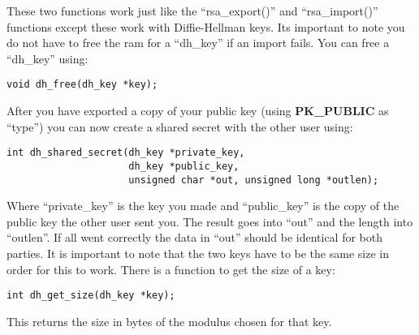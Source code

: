 \documentclass[synpaper]{book}
\begin{document}
These two functions work just like the ``rsa\_export()'' and ``rsa\_import()'' functions except these work with 
Diffie-Hellman keys. Its important to note you do not have to free the ram for a ``dh\_key'' if an import fails.  You can free a 
``dh\_key'' using:
\begin{verbatim}
void dh_free(dh_key *key);
\end{verbatim}
After you have exported a copy of your public key (using {\bf PK\_PUBLIC} as ``type'') you can now create a shared secret 
with the other user using:
\begin{verbatim}
int dh_shared_secret(dh_key *private_key, 
                     dh_key *public_key, 
                     unsigned char *out, unsigned long *outlen);
\end{verbatim}

Where ``private\_key'' is the key you made and ``public\_key'' is the copy of the public key the other user sent you.  The result goes
into ``out'' and the length into ``outlen''.  If all went correctly the data in ``out'' should be identical for both parties.  It is important to
note that the two keys have to be the same size in order for this to work.  There is a function to get the size of a
key:
\begin{verbatim}
int dh_get_size(dh_key *key);
\end{verbatim}
This returns the size in bytes of the modulus chosen for that key.
\end{document}
